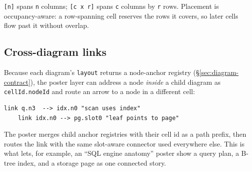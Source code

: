 \texttt{[n]} spans \texttt{n} columns; \texttt{[c x r]} spans \texttt{c} columns
by \texttt{r} rows. Placement is occupancy-aware: a row-spanning cell reserves the
rows it covers, so later cells flow past it without overlap.

\subsection{Cross-diagram links}

Because each diagram's \texttt{layout} returns a node-anchor registry
(\S\ref{sec:diagram-contract}), the poster layer can address a node \emph{inside}
a child diagram as \texttt{cellId.nodeId} and route an arrow to a node in a
different cell:

\begin{lstlisting}[language=triton]
    link q.n3  --> idx.n0 "scan uses index"
    link idx.n0 --> pg.slot0 "leaf points to page"
\end{lstlisting}

The poster merges child anchor registries with their cell id as a path prefix,
then routes the link with the same slot-aware connector used everywhere else. This
is what lets, for example, an ``SQL engine anatomy'' poster show a query plan, a
B-tree index, and a storage page as one connected story.

